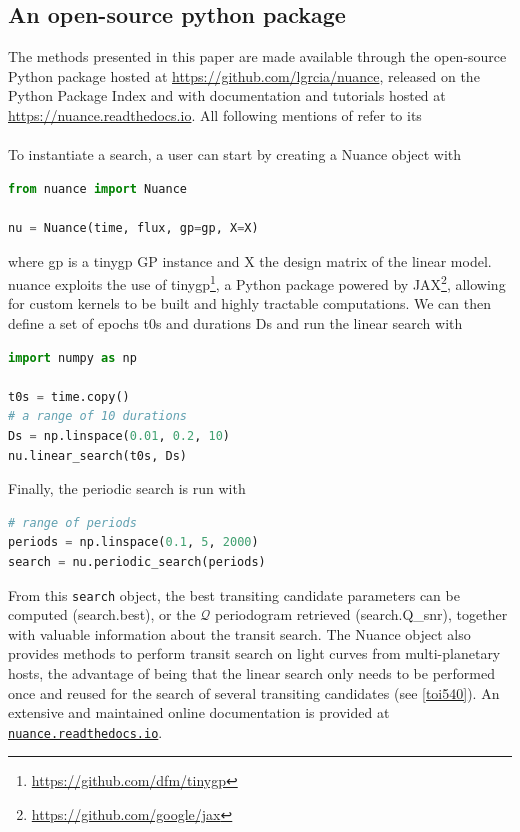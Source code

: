\documentclass[modern]{aastex631}
\begin{document}
\subsection{An open-source python package}\label{package}
The methods presented in this paper are made available through the \nuancecode{} open-source Python package hosted at \href{https://github.com/lgrcia/nuance}{https://github.com/lgrcia/nuance}, released on the Python Package Index and with documentation and tutorials hosted at \href{https://nuance.readthedocs.io}{https://nuance.readthedocs.io}. All following mentions of \nuancecode{} refer to its  \\\\
To instantiate a search, a user can start by creating a \textsf{Nuance} object with
\begin{lstlisting}[language=Python]
from nuance import Nuance

nu = Nuance(time, flux, gp=gp, X=X)
\end{lstlisting}
where \textsf{gp} is a \textsf{tinygp} GP instance and \textsf{X} the design matrix of the linear model. \textsf{nuance} exploits the use of \textsf{tinygp}\footnote{\href{https://github.com/dfm/tinygp}{https://github.com/dfm/tinygp}}, a Python package powered by \textsf{JAX}\footnote{\href{https://github.com/google/jax}{https://github.com/google/jax}}, allowing for custom kernels to be built and highly tractable computations. We can then define a set of epochs \textsf{t0s} and durations \textsf{Ds} and run the linear search with
\begin{lstlisting}[language=Python,linewidth=\linewidth]
import numpy as np

t0s = time.copy()
# a range of 10 durations
Ds = np.linspace(0.01, 0.2, 10)
nu.linear_search(t0s, Ds)
\end{lstlisting}
Finally, the periodic search is run with
\begin{lstlisting}[language=Python]
# range of periods
periods = np.linspace(0.1, 5, 2000)
search = nu.periodic_search(periods)
\end{lstlisting}
From this \texttt{search} object, the best transiting candidate parameters can be computed (\textsf{search.best}), or the $\mathcal{Q}$ periodogram retrieved (\textsf{search.Q\_snr}), together with valuable information about the transit search. The \textsf{Nuance} object also provides methods to perform transit search on light curves from multi-planetary hosts, the advantage of \nuancemethod{} being that the linear search only needs to be performed once and reused for the search of several transiting candidates (see \autoref{toi540}). An extensive and maintained online documentation is provided at \href{https://nuance.readthedocs.io}{\texttt{nuance.readthedocs.io}}.
\end{document}
